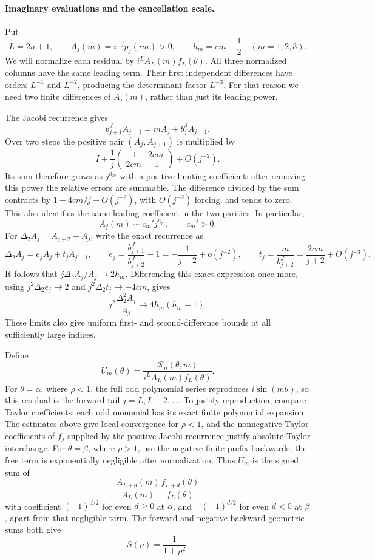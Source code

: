 \paragraph{Imaginary evaluations and the cancellation scale.}
Put
\[
 L=2n+1,\qquad A_j(m)=i^{-j}p_j(im)>0,
 \qquad h_m=cm-\frac12 \quad(m=1,2,3).
\]
We will normalize each residual by $i^L A_L(m)f_L(\theta)$.
All three normalized columns have the same leading term. Their first
independent differences have orders $L^{-1}$ and $L^{-2}$, producing
the determinant factor $L^{-3}$. For that reason we need two finite
differences of $A_j(m)$, rather than just its leading power.

The Jacobi recurrence gives
\[
 b_{j+1}^{J}A_{j+1}=mA_j+b_j^{J}A_{j-1}.
\]
Over two steps the positive pair $(A_j,A_{j+1})$ is multiplied by
\[
 I+\frac1j\begin{pmatrix}-1&2cm\\2cm&-1\end{pmatrix}+O(j^{-2}).
\]
Its sum therefore grows as $j^{h_m}$ with a positive limiting
coefficient: after removing this power the relative errors are summable.
The difference divided by the sum contracts by
$1-4cm/j+O(j^{-2})$, with $O(j^{-2})$ forcing, and tends to zero.
This also identifies the same leading coefficient in the two parities.
In particular,
\[
 A_j(m)\sim c_m'j^{h_m},\qquad c_m'>0.
\]
For $\Delta_2 A_j=A_{j+2}-A_j$, write the exact recurrence as
\[
 \Delta_2 A_j=e_jA_j+t_jA_{j+1},\qquad
 e_j=\frac{b_{j+1}^{J}}{b_{j+2}^{J}}-1
       =-\frac1{j+2}+o(j^{-2}),\qquad
 t_j=\frac m{b_{j+2}^{J}}=\frac{2cm}{j+2}+O(j^{-3}).
\]
It follows that $j\Delta_2A_j/A_j\to2h_m$.
Differencing this exact expression once more, using
$j^2\Delta_2 e_j\to2$ and $j^2\Delta_2t_j\to-4cm$, gives
\[
 j^2\frac{\Delta_2^2 A_j}{A_j}\longrightarrow4h_m(h_m-1).
\]
These limits also give uniform first- and second-difference bounds at
all sufficiently large indices.

Define
\[
 U_m(\theta)=\frac{\mathscr R_n(\theta,m)}{i^L A_L(m)f_L(\theta)}.
\]
For $\theta=\alpha$, where $\rho<1$, the full odd polynomial series
reproduces $i\sin(m\theta)$, so this residual is the forward tail
$j=L,L+2,\ldots$. To justify reproduction, compare Taylor coefficients:
each odd monomial has its exact finite polynomial expansion. The
estimates above give local convergence for $\rho<1$, and the
nonnegative Taylor coefficients of $f_j$ supplied by the positive
Jacobi recurrence justify absolute Taylor interchange. For
$\theta=\beta$, where $\rho>1$, use the negative finite prefix
backwards; the free term is exponentially negligible after normalization.
Thus $U_m$ is the signed sum of
\[
 \frac{A_{L+d}(m)}{A_L(m)}\frac{f_{L+d}(\theta)}{f_L(\theta)}
\]
with coefficient $(-1)^{d/2}$ for even $d\ge0$ at $\alpha$, and
$-(-1)^{d/2}$ for even $d<0$ at $\beta$, apart from that negligible term.
The forward and negative-backward geometric sums both give
\[
 S(\rho)=\frac1{1+\rho^2}.
\]

